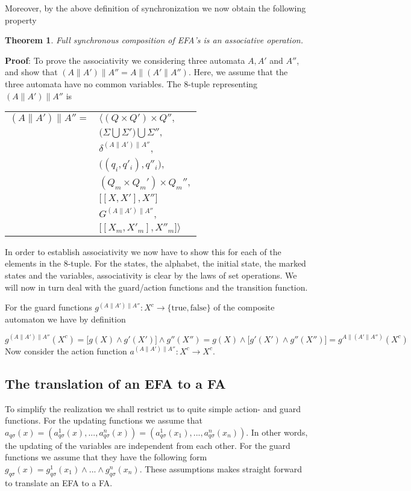 \documentclass{article}
\newtheorem{theorem}{Theorem}
\begin{document}
Moreover, by the above definition of synchronization we now obtain
the following property

\begin{theorem}
   Full synchronous composition of EFA's is an associative
   operation.
\end{theorem}

\noindent \textbf{Proof}: To prove the associativity we
considering three automata $A, A'$ and $A''$, and show that
$(A\|A')\|A'' = A\|(A'\|A'')$. Here, we assume that the three
automata have no common variables.
\newline\newline
\noindent The 8-tuple representing $(A\|A')\|A''$ is
\begin{center}
\begin{tabular}{ll}
  $(A\|A')\|A'' =$ & $\Big \langle (Q \times Q') \times Q'',$\\
  & $ \big(\Sigma \bigcup \Sigma' \big) \bigcup \Sigma'',$\\
  & $\delta^{(A\|A')\|A''},$\\
  & $\big((q_i, q'_i) , q''_i\big),$\\
  & $(Q_m \times Q_m') \times Q_m'',$\\
  & $\big[[X, X'], X'']$\\
  & $G^{(A\|A')\|A''},$\\
  & $\big[[X_m, X'_m], X''_m \big] \Big \rangle$
\end{tabular}
\end{center}

\noindent In order to establish associativity we now have to show
this for each of the elements in the 8-tuple. For the states, the
alphabet, the initial state, the marked states and the variables,
associativity is clear by the laws of set operations. We will now
in turn deal with the guard/action functions and the transition
function.

For the guard functions $g^{(A\|A')\|A''} : X^c \rightarrow
\{\mathrm{true}, \mathrm{false}\}$ of the composite automaton we
have by definition

\begin{equation}
  g^{(A\|A')\|A''}(X^c) = \big[g(X) \wedge g'(X') \big] \wedge g''(X'') = g(X) \wedge \big[g'(X') \wedge g''(X'')] = g^{A\|(A'\|A'')}(X^c)
\end{equation}
\noindent Now consider the action function $a^{(A\|A')\|A''} : X^c
\rightarrow X^c$.
\newpage
\subsection{The translation of an EFA to  a FA}
To simplify the realization we shall restrict us to quite simple
action- and guard functions. For the updating functions we assume
that $a_{q \sigma}(x)=(a^1_{q \sigma}(x),...,a^n_{q
\sigma}(x))=(a^1_{q \sigma}(x_1),...,a^n_{q \sigma}(x_n))$. In
other words, the updating of the variables are independent from
each other. For the guard functions we assume that they have the
following form $g_{q \sigma}(x)=g^1_{q \sigma}(x_1)\wedge
...\wedge g^n_{q \sigma}(x_n)$. These assumptions makes straight
forward to translate an EFA to a FA.
\end{document}
